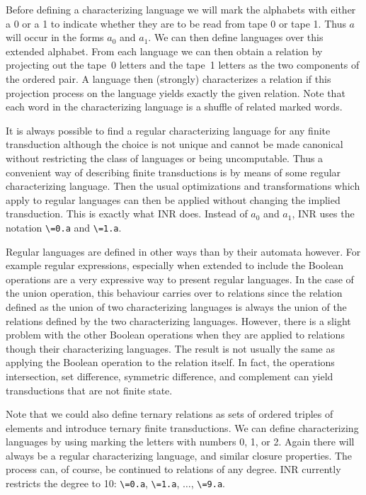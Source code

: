 Before defining a characterizing language we will mark the alphabets with
either a 0 or a 1 to indicate whether they are to be read from tape 0 or
tape 1.
Thus $a$ will occur in the forms $a_0$ and $a_1$.
We can then define languages over this extended alphabet.
From each language we can then obtain a relation by projecting out the
tape~0 letters and the tape~1 letters as the two components of the ordered
pair.
A language then (strongly) characterizes a relation if this projection
process on the language yields exactly the given relation.
Note that each word in the characterizing language is a shuffle of related
marked words.

It is always possible to find a regular characterizing language for any
finite transduction although the choice is not unique and cannot be made
canonical without restricting the class of languages or being
uncomputable.
Thus a convenient way of describing finite transductions is by means of
some regular characterizing language.
Then the usual optimizations and transformations which apply to regular
languages can then be applied without changing the implied transduction.
This is exactly what INR does.
Instead of $a_0$ and $a_1$, INR uses the notation \verb#\=0.a# and \verb#\=1.a#.

Regular languages are defined in other ways than by their automata however.
For example regular expressions, especially when extended to include the
Boolean operations are a very expressive way to present regular languages.
In the case of the union operation, this behaviour carries over to
relations since the relation defined as the union of two characterizing
languages is always the union of the relations defined by the two
characterizing languages.
However, there is a slight problem with the other Boolean operations when they
are applied to relations though their characterizing languages.
The result is not usually the same as applying the Boolean operation to the
relation itself.
In fact, the operations intersection, set difference, symmetric difference,
and complement can yield transductions that are not finite state.

Note that we could also define ternary relations as sets of ordered triples
of elements and introduce ternary finite transductions.
We can define characterizing languages by using marking the letters with
numbers 0, 1, or 2.
Again there will always be a regular characterizing language, and similar
closure properties.
The process can, of course, be continued to relations of any degree.
INR currently restricts the degree to 10: \verb#\=0.a#, \verb#\=1.a#, $\ldots$,
\verb#\=9.a#.

